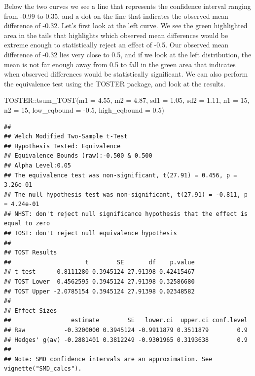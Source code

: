 \documentclass[
  oneside]{book}
\newenvironment{Shaded}{\begin{snugshade}}{\end{snugshade}}
\newcommand{\AttributeTok}[1]{\textcolor[rgb]{0.77,0.63,0.00}{#1}}
\newcommand{\DecValTok}[1]{\textcolor[rgb]{0.00,0.00,0.81}{#1}}
\newcommand{\FloatTok}[1]{\textcolor[rgb]{0.00,0.00,0.81}{#1}}
\newcommand{\FunctionTok}[1]{\textcolor[rgb]{0.00,0.00,0.00}{#1}}
\newcommand{\NormalTok}[1]{#1}
\newcommand{\SpecialCharTok}[1]{\textcolor[rgb]{0.00,0.00,0.00}{#1}}
\begin{document}
Below the two curves we see a line that represents the confidence interval ranging from -0.99 to 0.35, and a dot on the line that indicates the observed mean difference of -0.32. Let's first look at the left curve. We see the green highlighted area in the tails that highlights which observed mean differences would be extreme enough to statistically reject an effect of -0.5. Our observed mean difference of -0.32 lies very close to 0.5, and if we look at the left distribution, the mean is not far enough away from 0.5 to fall in the green area that indicates when observed differences would be statistically significant. We can also perform the equivalence test using the TOSTER package, and look at the results.

\begin{Shaded}
\begin{Highlighting}[]
\NormalTok{TOSTER}\SpecialCharTok{::}\FunctionTok{tsum\_TOST}\NormalTok{(}\AttributeTok{m1 =} \FloatTok{4.55}\NormalTok{, }
                  \AttributeTok{m2 =} \FloatTok{4.87}\NormalTok{, }
                  \AttributeTok{sd1 =} \FloatTok{1.05}\NormalTok{, }
                  \AttributeTok{sd2 =} \FloatTok{1.11}\NormalTok{,}
                  \AttributeTok{n1 =} \DecValTok{15}\NormalTok{, }
                  \AttributeTok{n2 =} \DecValTok{15}\NormalTok{, }
                  \AttributeTok{low\_eqbound =} \SpecialCharTok{{-}}\FloatTok{0.5}\NormalTok{, }
                  \AttributeTok{high\_eqbound =} \FloatTok{0.5}\NormalTok{)}
\end{Highlighting}
\end{Shaded}

\begin{verbatim}
## 
## Welch Modified Two-Sample t-Test
## Hypothesis Tested: Equivalence
## Equivalence Bounds (raw):-0.500 & 0.500
## Alpha Level:0.05
## The equivalence test was non-significant, t(27.91) = 0.456, p = 3.26e-01
## The null hypothesis test was non-significant, t(27.91) = -0.811, p = 4.24e-01
## NHST: don't reject null significance hypothesis that the effect is equal to zero 
## TOST: don't reject null equivalence hypothesis
## 
## TOST Results 
##                     t        SE       df    p.value
## t-test     -0.8111280 0.3945124 27.91398 0.42415467
## TOST Lower  0.4562595 0.3945124 27.91398 0.32586680
## TOST Upper -2.0785154 0.3945124 27.91398 0.02348582
## 
## Effect Sizes 
##                 estimate        SE   lower.ci  upper.ci conf.level
## Raw           -0.3200000 0.3945124 -0.9911879 0.3511879        0.9
## Hedges' g(av) -0.2881401 0.3812249 -0.9301965 0.3193638        0.9
## 
## Note: SMD confidence intervals are an approximation. See vignette("SMD_calcs").
\end{verbatim}
\end{document}
